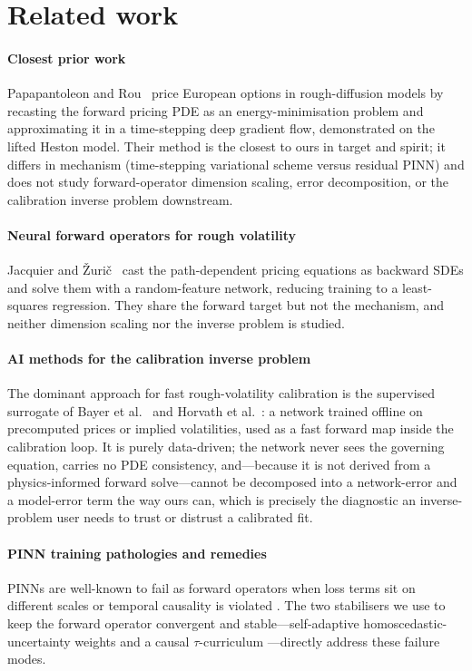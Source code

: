 \documentclass[preprint,12pt]{elsarticle}
\begin{document}
\section{Related work}
\label{sec:related}

\paragraph{Closest prior work}
Papapantoleon and Rou~\citep{papapantoleon2025timestepping} price European options in rough-diffusion
models by recasting the forward pricing PDE as an energy-minimisation problem and
approximating it in a time-stepping deep gradient flow, demonstrated on the
lifted Heston model. Their method is the closest to ours in target and spirit; it
differs in mechanism (time-stepping variational scheme versus residual PINN) and
does not study forward-operator dimension scaling, error decomposition, or the
calibration inverse problem downstream.

\paragraph{Neural forward operators for rough volatility}
Jacquier and \v{Z}uri\v{c}~\citep{jacquier2023random} cast the path-dependent pricing equations as backward
SDEs and solve them with a random-feature network, reducing training to a
least-squares regression. They share the forward target but not the mechanism,
and neither dimension scaling nor the inverse problem is studied.

\paragraph{AI methods for the calibration inverse problem}
The dominant approach for fast rough-volatility calibration is the supervised
surrogate of Bayer et al.~\citep{bayer2019deep} and Horvath et al.~\citep{horvath2021deep}: a network trained
offline on precomputed prices or implied volatilities, used as a fast forward map
inside the calibration loop. It is purely data-driven; the network never sees the
governing equation, carries no PDE consistency, and---because it is not derived
from a physics-informed forward solve---cannot be decomposed into a network-error
and a model-error term the way ours can, which is precisely the diagnostic an
inverse-problem user needs to trust or distrust a calibrated fit.

\paragraph{PINN training pathologies and remedies}
PINNs are well-known to fail as forward operators when loss terms sit on
different scales or temporal causality is violated
\citep{krishnapriyan2021characterizing,wang2022when}. The two stabilisers we use
to keep the forward operator convergent and stable---self-adaptive
homoscedastic-uncertainty weights \citep{kendall2018multitask,mcclenny2023self}
and a causal $\tau$-curriculum \citep{wang2024respecting}---directly address
these failure modes.
\end{document}
